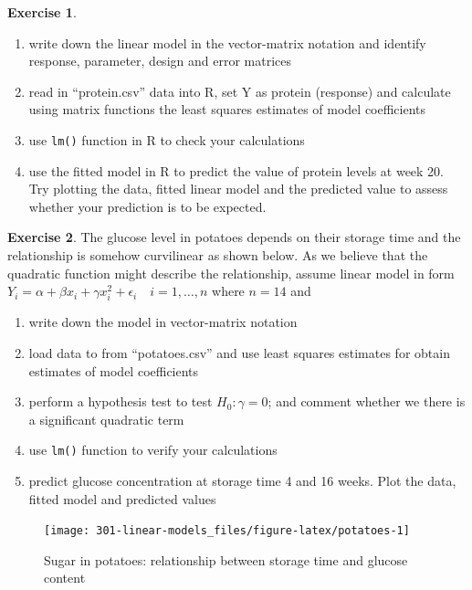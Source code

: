\documentclass[
]{book}
\providecommand{\tightlist}{%
  \setlength{\itemsep}{0pt}\setlength{\parskip}{0pt}}
\theoremstyle{definition}
\theoremstyle{definition}
\theoremstyle{definition}
\newtheorem{exercise}{Exercise}[chapter]
\theoremstyle{remark}
\begin{document}
\begin{exercise}
\begin{enumerate}
\def\labelenumi{\alph{enumi})}
\setcounter{enumi}{2}
\tightlist
\item
  write down the linear model in the vector-matrix notation and identify response, parameter, design and error matrices
\item
  read in ``protein.csv'' data into R, set Y as protein (response) and calculate using matrix functions the least squares estimates of model coefficients
\item
  use \texttt{lm()} function in R to check your calculations
\item
  use the fitted model in R to predict the value of protein levels at week 20. Try plotting the data, fitted linear model and the predicted value to assess whether your prediction is to be expected.
\end{enumerate}
\end{exercise}

\begin{exercise}
\protect\hypertarget{exr:lm-potato}{}{\label{exr:lm-potato} }
The glucose level in potatoes depends on their storage time and the relationship is somehow curvilinear as shown below.
As we believe that the quadratic function might describe the relationship, assume linear model in form
\(Y_i = \alpha + \beta x_i + \gamma x_i^2 + \epsilon_i \quad i=1,\dots,n\) where \(n=14\) and

\begin{enumerate}
\def\labelenumi{\alph{enumi})}
\tightlist
\item
  write down the model in vector-matrix notation
\item
  load data to from ``potatoes.csv'' and use least squares estimates for obtain estimates of model coefficients
\item
  perform a hypothesis test to test \(H_0:\gamma=0\); and comment whether we there is a significant quadratic term
\item
  use \texttt{lm()} function to verify your calculations
\item
  predict glucose concentration at storage time 4 and 16 weeks. Plot the data, fitted model and predicted values
\end{enumerate}
\end{exercise}

\begin{figure}

{\centering \texttt{[image: 301-linear-models\_files/figure-latex/potatoes-1]} 

}

\caption{Sugar in potatoes: relationship between storage time and glucose content}\label{fig:potatoes}
\end{figure}
\end{document}
